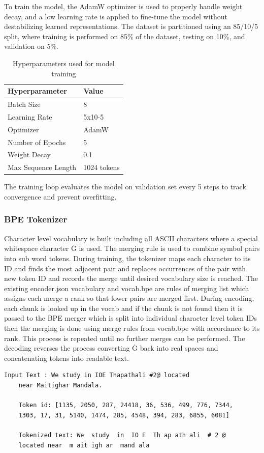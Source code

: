 To train the model, the AdamW optimizer is used to properly handle weight decay, and a low learning rate is applied to fine-tune the model without destabilizing learned representations. The dataset is partitioned using an 85/10/5 split, where training is performed on 85\% of the dataset, testing on 10\%, and validation on 5\%.

\begin{table}[ht]
	\caption{Hyperparameters used for model training}
	\centering
	\begin{tabular}{|l|l|}
		\hline
		\textbf{Hyperparameter} & \textbf{Value} \\
		\hline
		Batch Size &  8\\
		Learning Rate & 5x10-5 \\
		Optimizer & AdamW \\
		Number of Epochs &  5\\
		Weight Decay &  0.1\\
		Max Sequence Length & 1024 tokens \\
		\hline
	\end{tabular}
\end{table}

The training loop evaluates the model on validation set every 5 steps to track convergence and prevent overfitting.

\subsubsection{BPE Tokenizer}
Character level vocabulary is built including all ASCII characters where a special whitespace character Ġ is used. The merging rule is used to combine symbol pairs into sub word tokens. During training, the tokenizer maps each character to its ID and finds the most adjacent pair and replaces occurrences of the pair with new token ID and records the merge until desired vocabulary size is reached. The existing encoder.json vocabulary and vocab.bpe are rules of merging list which assigns each merge a rank so that lower pairs are merged first. During encoding, each chunk is looked up in the vocab and if the chunk is not found then it is passed to the  BPE merger which is split into individual character level token IDs then the merging is done using merge rules from vocab.bpe with accordance to its rank. This process is repeated until no further merges can be performed. The decoding reverses the process converting Ġ back into real spaces and concatenating tokens into readable text.  

\begin{lstlisting}[basicstyle=\footnotesize\ttfamily,caption = Output of BPE Tokenizer on a sample text]
    Input Text : We study in IOE Thapathali #2@ located 
    near Maitighar Mandala.

    Token id: [1135, 2050, 287, 24418, 36, 536, 499, 776, 7344, 
    1303, 17, 31, 5140, 1474, 285, 4548, 394, 283, 6855, 6081]

    Tokenized text: We  study  in  IO E  Th ap ath ali  # 2 @ 
    located near  m ait igh ar  mand ala
\end{lstlisting}

